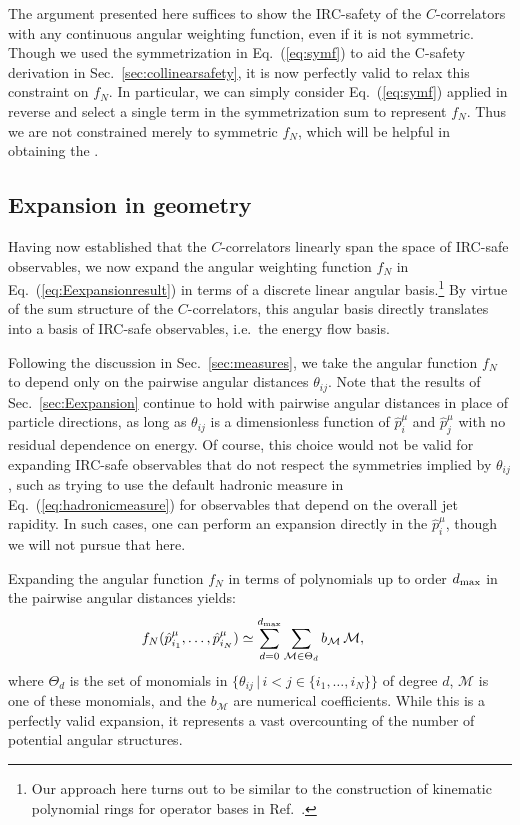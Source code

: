 \documentclass[letterpaper,11pt]{article}
\DeclareRobustCommand{\Sec}[1]{Sec.~\ref{#1}}
\DeclareRobustCommand{\Eq}[1]{Eq.~(\ref{#1})}
\DeclareRobustCommand{\Ref}[1]{Ref.~\cite{#1}}
\newcommand{\Bs}{\text{EFPs}\xspace}
\begin{document}
The argument presented here suffices to show the IRC-safety of the $C$-correlators with any continuous angular weighting function, even if it is not symmetric.
%
Though we used the symmetrization in \Eq{eq:symf} to aid the C-safety derivation in \Sec{sec:collinearsafety}, it is now perfectly valid to relax this constraint on $f_N$.
%
In particular, we can simply consider \Eq{eq:symf} applied in reverse and select a single term in the symmetrization sum to represent $f_N$.
%
Thus we are not constrained merely to symmetric $f_N$, which will be helpful in obtaining the \Bs. 


\subsection{Expansion in geometry}
\label{sec:angleexpansion}

Having now established that the $C$-correlators linearly span the space of IRC-safe observables, we now expand the angular weighting function $f_N$ in \Eq{eq:Eexpansionresult} in terms of a discrete linear angular basis.\footnote{Our approach here turns out to be similar to the construction of kinematic polynomial rings for operator bases in \Ref{Henning:2017fpj}.}
%
By virtue of the sum structure of the $C$-correlators, this angular basis directly translates into a basis of IRC-safe observables, i.e.\ the energy flow basis.

Following the discussion in \Sec{sec:measures}, we take the angular function $f_N$ to depend only on the pairwise angular distances $\theta_{ij}$.
%
Note that the results of \Sec{sec:Eexpansion} continue to hold with pairwise angular distances in place of particle directions, as long as $\theta_{ij}$ is a dimensionless function of $\hat{p}_i^\mu$ and $\hat{p}_j^\mu$ with no residual dependence on energy.
%
Of course, this choice would not be valid for expanding IRC-safe observables that do not respect the symmetries implied by $\theta_{ij}$, such as trying to use the default hadronic measure in \Eq{eq:hadronicmeasure} for observables that depend on the overall jet rapidity.
%
In such cases, one can perform an expansion directly in the $\hat p_{i}^\mu$, though we will not pursue that here.

Expanding the angular function $f_N$ in terms of polynomials up to order $d_{\rm max}$ in the pairwise angular distances yields:
\begin{align}\label{eq:angexp}
f_N(\hat p_{i_1}^\mu,\ldots,\hat p_{i_N}^\mu)&\simeq\sum_{d=0}^{d_{\rm max}} \sum_{\mathcal M\in \Theta_d} b_{\mathcal M} \,\mathcal M,
\end{align}
where $\Theta_d$ is the set of monomials in $\{\theta_{ij}\,|\,i<j\in \{i_1,\ldots,i_N\}\}$ of degree $d$, $\mathcal M$ is one of these monomials, and the $b_{\mathcal M}$ are numerical coefficients.
%
While this is a perfectly valid expansion, it represents a vast overcounting of the number of potential angular structures.
\end{document}
